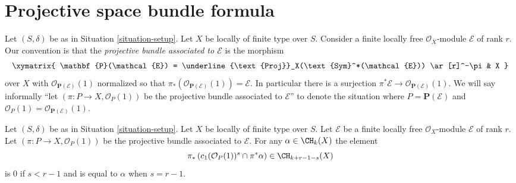\section{Projective space bundle formula}
\label{section-projective-space-bundle-formula}

\noindent
Let $(S, \delta)$ be as in Situation \ref{situation-setup}.
Let $X$ be locally of finite type over $S$.
Consider a finite locally free $\mathcal{O}_X$-module
$\mathcal{E}$ of rank $r$.
Our convention is that the {\it projective bundle associated to
$\mathcal{E}$} is the morphism
$$
\xymatrix{
\mathbf{P}(\mathcal{E}) =
\underline{\text{Proj}}_X(\text{Sym}^*(\mathcal{E}))
\ar[r]^-\pi
& X
}
$$
over $X$ with
$\mathcal{O}_{\mathbf{P}(\mathcal{E})}(1)$ normalized so that
$\pi_*(\mathcal{O}_{\mathbf{P}(\mathcal{E})}(1)) = \mathcal{E}$.
In particular there is a surjection
$\pi^*\mathcal{E} \to \mathcal{O}_{\mathbf{P}(\mathcal{E})}(1)$.
We will say informally ``let $(\pi : P \to X, \mathcal{O}_P(1))$
be the projective bundle associated to $\mathcal{E}$'' to denote
the situation where $P = \mathbf{P}(\mathcal{E})$ and
$\mathcal{O}_P(1) = \mathcal{O}_{\mathbf{P}(\mathcal{E})}(1)$.

\begin{lemma}
\label{lemma-cap-projective-bundle}
Let $(S, \delta)$ be as in Situation \ref{situation-setup}.
Let $X$ be locally of finite type over $S$.
Let $\mathcal{E}$ be a finite locally free $\mathcal{O}_X$-module
$\mathcal{E}$ of rank $r$. Let $(\pi : P \to X, \mathcal{O}_P(1))$
be the projective bundle associated to $\mathcal{E}$.
For any $\alpha \in \CH_k(X)$ the element
$$
\pi_*\left(
c_1(\mathcal{O}_P(1))^s \cap \pi^*\alpha
\right)
\in
\CH_{k + r - 1 - s}(X)
$$
is $0$ if $s < r - 1$ and is equal to $\alpha$ when $s = r - 1$.
\end{lemma}

